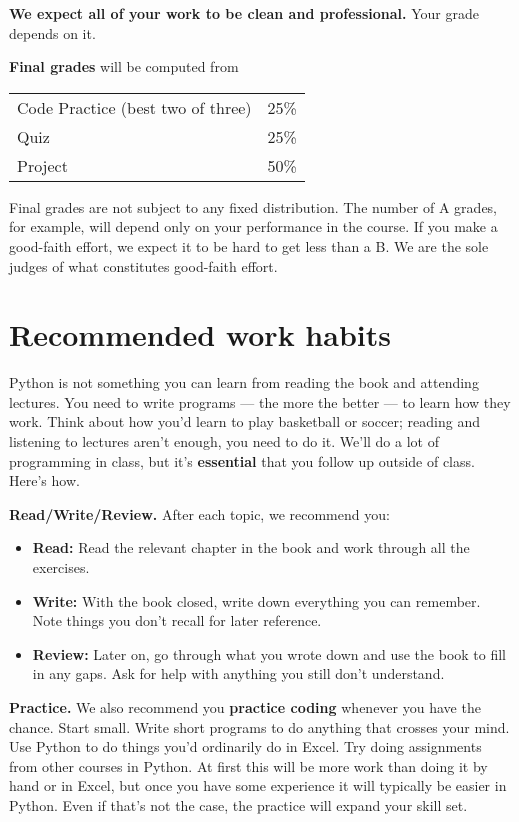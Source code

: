 \documentclass[11pt]{article}
\begin{document}
{\bf We expect all of your work to be clean and professional.}  Your grade depends on it.


{\bf Final grades\/} will be computed from
\begin{center}
\begin{tabular}{ll}
Code Practice (best two of three) & 25\% \\
Quiz        & 25\% \\
Project     & 50\% \\
\end{tabular}
\end{center}
Final grades are not subject to any fixed distribution.
The number of A grades, for example,
will depend only on your performance in the course.
If you make a good-faith effort,
we expect it to be hard to get less than a B.
We are the sole judges of what constitutes good-faith effort.


\section*{Recommended work habits}

Python is not something you can learn from reading the book and attending lectures.
You need to write programs ---
the more the better --- to learn how they work.
Think about how you'd learn to play basketball or soccer;
reading and listening to lectures aren't enough, you need to do it.
We'll do a lot of programming in class, but it's {\bf essential\/} that you
follow up outside of class.
Here's how.


{\bf Read/Write/Review.\/}
After each topic, we recommend you:
%
\begin{itemize}
\item {\bf Read:\/} Read the relevant chapter in the book and work through all the exercises.
\item {\bf Write:\/}  With the book closed, write down everything you can remember.  Note things
you don't recall for later reference.
\item {\bf Review:\/} Later on, go through what you wrote down and use the book to fill in any gaps.
Ask for help with anything you still don't understand.
\end{itemize}
%

{\bf Practice.\/}
We also recommend you {\bf practice coding\/} whenever you have the chance.
Start small. Write short programs to do anything that crosses your mind.
Use Python to do things you'd ordinarily do in Excel.
Try doing assignments from other courses in Python.
At first this will be more work than doing it by hand or in Excel,
but once you have some experience it will typically be easier in Python.
Even if that's not the case, the practice will expand your skill set.
\end{document}
